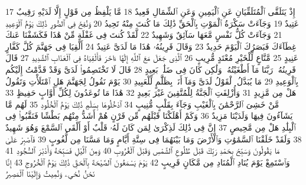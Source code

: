 {\tiny\colorbox{cl_aya}{17}} إِذْ يَتَلَقَّى ٱلْمُتَلَقِّيَانِ عَنِ ٱلْيَمِينِ وَعَنِ ٱلشِّمَالِ قَعِيدٌ
{\tiny\colorbox{cl_aya}{18}} مَّا يَلْفِظُ مِن قَوْلٍ إِلَّا لَدَيْهِ رَقِيبٌ عَتِيدٌ
{\tiny\colorbox{cl_aya}{19}} وَجَآءَتْ سَكْرَةُ ٱلْمَوْتِ بِٱلْحَقِّ ذَٰلِكَ مَا كُنتَ مِنْهُ تَحِيدُ
{\tiny\colorbox{cl_aya}{20}} وَنُفِخَ فِى ٱلصُّورِ ذَٰلِكَ يَوْمُ ٱلْوَعِيدِ
{\tiny\colorbox{cl_aya}{21}} وَجَآءَتْ كُلُّ نَفْسٍ مَّعَهَا سَآئِقٌ وَشَهِيدٌ
{\tiny\colorbox{cl_aya}{22}} لَّقَدْ كُنتَ فِى غَفْلَةٍ مِّنْ هَٰذَا فَكَشَفْنَا عَنكَ غِطَآءَكَ فَبَصَرُكَ ٱلْيَوْمَ حَدِيدٌ
{\tiny\colorbox{cl_aya}{23}} وَقَالَ قَرِينُهُۥ هَٰذَا مَا لَدَىَّ عَتِيدٌ
{\tiny\colorbox{cl_aya}{24}} أَلْقِيَا فِى جَهَنَّمَ كُلَّ كَفَّارٍ عَنِيدٍ
{\tiny\colorbox{cl_aya}{25}} مَّنَّاعٍ لِّلْخَيْرِ مُعْتَدٍ مُّرِيبٍ
{\tiny\colorbox{cl_aya}{26}} ٱلَّذِى جَعَلَ مَعَ ٱللَّهِ إِلَٰهًا ءَاخَرَ فَأَلْقِيَاهُ فِى ٱلْعَذَابِ ٱلشَّدِيدِ
{\tiny\colorbox{cl_aya}{27}} قَالَ قَرِينُهُۥ رَبَّنَا مَآ أَطْغَيْتُهُۥ وَلَٰكِن كَانَ فِى ضَلَٰلٍۭ بَعِيدٍ
{\tiny\colorbox{cl_aya}{28}} قَالَ لَا تَخْتَصِمُوا۟ لَدَىَّ وَقَدْ قَدَّمْتُ إِلَيْكُم بِٱلْوَعِيدِ
{\tiny\colorbox{cl_aya}{29}} مَا يُبَدَّلُ ٱلْقَوْلُ لَدَىَّ وَمَآ أَنَا۠ بِظَلَّٰمٍ لِّلْعَبِيدِ
{\tiny\colorbox{cl_aya}{30}} يَوْمَ نَقُولُ لِجَهَنَّمَ هَلِ ٱمْتَلَأْتِ وَتَقُولُ هَلْ مِن مَّزِيدٍ
{\tiny\colorbox{cl_aya}{31}} وَأُزْلِفَتِ ٱلْجَنَّةُ لِلْمُتَّقِينَ غَيْرَ بَعِيدٍ
{\tiny\colorbox{cl_aya}{32}} هَٰذَا مَا تُوعَدُونَ لِكُلِّ أَوَّابٍ حَفِيظٍ
{\tiny\colorbox{cl_aya}{33}} مَّنْ خَشِىَ ٱلرَّحْمَٰنَ بِٱلْغَيْبِ وَجَآءَ بِقَلْبٍ مُّنِيبٍ
{\tiny\colorbox{cl_aya}{34}} ٱدْخُلُوهَا بِسَلَٰمٍ ذَٰلِكَ يَوْمُ ٱلْخُلُودِ
{\tiny\colorbox{cl_aya}{35}} لَهُم مَّا يَشَآءُونَ فِيهَا وَلَدَيْنَا مَزِيدٌ
{\tiny\colorbox{cl_aya}{36}} وَكَمْ أَهْلَكْنَا قَبْلَهُم مِّن قَرْنٍ هُمْ أَشَدُّ مِنْهُم بَطْشًا فَنَقَّبُوا۟ فِى ٱلْبِلَٰدِ هَلْ مِن مَّحِيصٍ
{\tiny\colorbox{cl_aya}{37}} إِنَّ فِى ذَٰلِكَ لَذِكْرَىٰ لِمَن كَانَ لَهُۥ قَلْبٌ أَوْ أَلْقَى ٱلسَّمْعَ وَهُوَ شَهِيدٌ
{\tiny\colorbox{cl_aya}{38}} وَلَقَدْ خَلَقْنَا ٱلسَّمَٰوَٰتِ وَٱلْأَرْضَ وَمَا بَيْنَهُمَا فِى سِتَّةِ أَيَّامٍ وَمَا مَسَّنَا مِن لُّغُوبٍ
{\tiny\colorbox{cl_aya}{39}} فَٱصْبِرْ عَلَىٰ مَا يَقُولُونَ وَسَبِّحْ بِحَمْدِ رَبِّكَ قَبْلَ طُلُوعِ ٱلشَّمْسِ وَقَبْلَ ٱلْغُرُوبِ
{\tiny\colorbox{cl_aya}{40}} وَمِنَ ٱلَّيْلِ فَسَبِّحْهُ وَأَدْبَٰرَ ٱلسُّجُودِ
{\tiny\colorbox{cl_aya}{41}} وَٱسْتَمِعْ يَوْمَ يُنَادِ ٱلْمُنَادِ مِن مَّكَانٍ قَرِيبٍ
{\tiny\colorbox{cl_aya}{42}} يَوْمَ يَسْمَعُونَ ٱلصَّيْحَةَ بِٱلْحَقِّ ذَٰلِكَ يَوْمُ ٱلْخُرُوجِ
{\tiny\colorbox{cl_aya}{43}} إِنَّا نَحْنُ نُحْىِۦ وَنُمِيتُ وَإِلَيْنَا ٱلْمَصِيرُ
